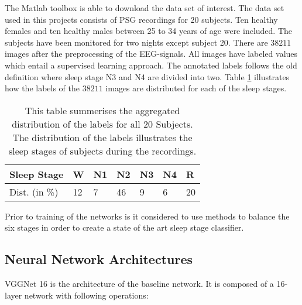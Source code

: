 The Matlab toolbox is able to download the data set of interest. The data set used in this projects consists of PSG recordings for 20 subjects. Ten healthy females and ten healthy males between 25 to 34 years of age were included. The subjects have been monitored for two nights except subject 20. There are $38211$ images after the preprocessing of the EEG-signals. All images have labeled values which entail a supervised learning approach. The annotated labels follows the old definition where sleep stage N3 and N4 are divided into two. Table \ref{tab_class_balance} illustrates how the labels of the $38211$ images are distributed for each of the sleep stages.

\begin{table}[th!]
\begin{tabular}{l|llllll}
Sleep Stage & W & N1 &  N2& N3 & N4 & R \\\hline
Dist. (in \%) &12 &7&46&9&6&20
\end{tabular}
\caption{This table summerises the aggregated distribution of the labels for all 20 Subjects. The distribution of the labels illustrates the sleep stages of subjects during the recordings.}
\label{tab_class_balance}
\end{table}

Prior to training of the networks is it considered to use methods to balance the six stages in order to create a state of the art sleep stage classifier.

\subsection{Neural Network Architectures}
VGGNet 16 \cite{main_ar, VGGnet16} is the architecture of the baseline network. It is composed of a 16-layer network with following operations:

